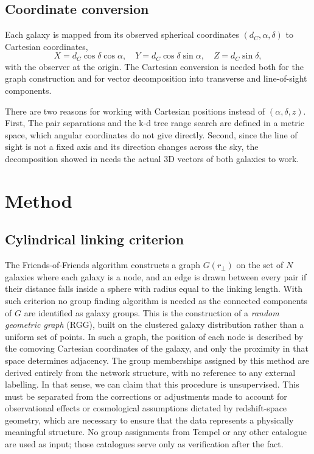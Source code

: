 \documentclass[9pt,a4paper,twocolumn,twoside]{rho-class/rho}
\begin{document}
\subsection{Coordinate conversion}

Each galaxy is mapped from its observed spherical coordinates
$(d_C, \alpha, \delta)$ to Cartesian coordinates,
\begin{equation}\label{eq:cartesian}
    X = d_C\cos\delta\cos\alpha, \quad
    Y = d_C\cos\delta\sin\alpha, \quad
    Z = d_C\sin\delta,
\end{equation}
with the observer at the origin. The Cartesian conversion is needed both for the
graph construction and for vector decomposition into transverse and line-of-sight
components.

There are two reasons for working with Cartesian positions instead of $(\alpha, \delta, z)$.
First, The pair separations and the k-d tree range
search are defined in a metric space, which angular coordinates do not give
directly. Second, since the line of sight is not a fixed axis and its
direction changes across the sky, the decomposition showed in 
needs the actual 3D vectors of both galaxies to work.

\section{Method}

\subsection{Cylindrical linking criterion}

The Friends-of-Friends algorithm constructs a graph $G(r_\perp)$ on the set of
$N$ galaxies where each galaxy is a node, and an edge is drawn between every
pair if their distance falls inside a sphere with radius equal to the linking
length. With such criterion no group finding algorithm is needed as the connected
components of $G$ are identified as galaxy groups. This is the construction of a
\emph{random geometric graph} (RGG), built on the clustered galaxy distribution
rather than a uniform set of points. In such a graph, the position of each node
is described by the comoving Cartesian coordinates of the galaxy, and only the
proximity in that space determines adjacency. The group memberships assigned by
this method are derived entirely from the network structure, with no reference to
any external labelling. In that sense, we can claim that this procedure is
unsupervised. This must be separated from the corrections or adjustments made to
account for observational effects or cosmological assumptions dictated by
redshift-space geometry, which are necessary to ensure that the data represents
a physically meaningful structure. No group assignments from Tempel or any other
catalogue are used as input; those catalogues serve only as verification after
the fact.
\end{document}

